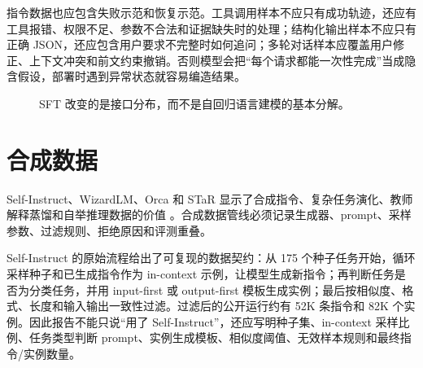 \documentclass[UTF8,zihao=-4,openany]{ctexbook}
\begin{document}
指令数据也应包含失败示范和恢复示范。工具调用样本不应只有成功轨迹，还应有工具报错、权限不足、参数不合法和证据缺失时的处理；结构化输出样本不应只有正确 JSON，还应包含用户要求不完整时如何追问；多轮对话样本应覆盖用户修正、上下文冲突和前文约束撤销。否则模型会把“每个请求都能一次性完成”当成隐含假设，部署时遇到异常状态就容易编造结果。

\begin{figure}[t]
\centering
{}
\caption{SFT 改变的是接口分布，而不是自回归语言建模的基本分解。}
\label{fig:zh-sft-interface-contract}
\end{figure}

\section{合成数据}
Self-Instruct、WizardLM、Orca 和 STaR 显示了合成指令、复杂任务演化、教师解释蒸馏和自举推理数据的价值 \cite{wang2022selfinstruct,xu2023wizardlm,mukherjee2023orca,zelikman2022star}。合成数据管线必须记录生成器、prompt、采样参数、过滤规则、拒绝原因和评测重叠。

Self-Instruct 的原始流程给出了可复现的数据契约：从 175 个种子任务开始，循环采样种子和已生成指令作为 in-context 示例，让模型生成新指令；再判断任务是否为分类任务，并用 input-first 或 output-first 模板生成实例；最后按相似度、格式、长度和输入输出一致性过滤。过滤后的公开运行约有 52K 条指令和 82K 个实例。因此报告不能只说“用了 Self-Instruct”，还应写明种子集、in-context 采样比例、任务类型判断 prompt、实例生成模板、相似度阈值、无效样本规则和最终指令/实例数量。
\end{document}
